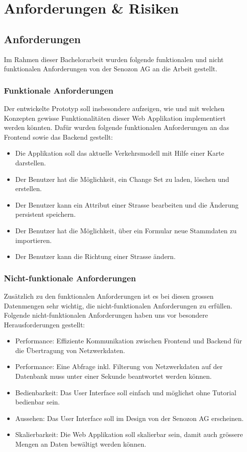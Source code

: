 \chapter{Anforderungen \& Risiken} \label{ch:anforderungen_section}
\section{Anforderungen}
Im Rahmen dieser Bachelorarbeit wurden folgende funktionalen und nicht funktionalen Anforderungen von der Senozon AG an die Arbeit gestellt.
\subsection{Funktionale Anforderungen}
Der entwickelte Prototyp soll insbesondere aufzeigen, wie und mit welchen Konzepten gewisse Funktionalitäten dieser Web Applikation implementiert werden könnten. Dafür wurden folgende funktionalen Anforderungen an das Frontend sowie das Backend gestellt:
\begin{itemize}
\itemsep0em
\item Die Applikation soll das aktuelle Verkehrsmodell mit Hilfe einer Karte darstellen.
\item Der Benutzer hat die Möglichkeit, ein Change Set zu laden, löschen und erstellen.
\item Der Benutzer kann ein Attribut einer Strasse bearbeiten und die Änderung persistent speichern.
\item Der Benutzer hat die Möglichkeit, über ein Formular neue Stammdaten zu importieren.
\item Der Benutzer kann die Richtung einer Strasse ändern.
\end{itemize}
\subsection{Nicht-funktionale Anforderungen}
\label{ch:NFRs}
Zusätzlich zu den funktionalen Anforderungen ist es bei diesen grossen Datenmengen sehr wichtig, die nicht-funktionalen Anforderungen zu erfüllen. Folgende nicht-funktionalen Anforderungen haben uns vor besondere Herausforderungen gestellt:
\begin{itemize}
\itemsep0em
\item Performance: Effiziente Kommunikation zwischen Frontend und Backend für die Übertragung von Netzwerkdaten.
\item Performance: Eine Abfrage inkl. Filterung von Netzwerkdaten auf der Datenbank muss unter einer Sekunde beantwortet werden können.
\item Bedienbarkeit: Das User Interface soll einfach und möglichst ohne Tutorial bedienbar sein.
\item Aussehen: Das User Interface soll im Design von der Senozon AG erscheinen.
\item Skalierbarkeit: Die Web Applikation soll skalierbar sein, damit auch grössere Mengen an Daten bewältigt werden können.
\end{itemize}
